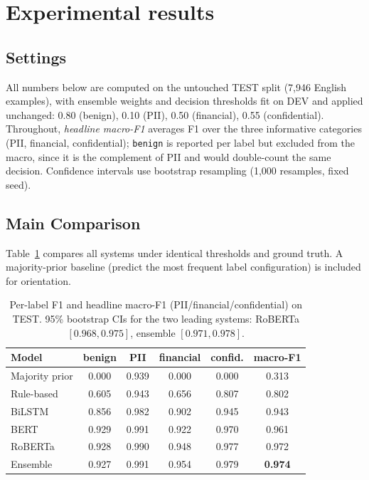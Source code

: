 \documentclass{article}
\begin{document}
\section{Experimental results}
\label{sec:results}

\subsection{Settings}
\label{subsec:settings}

All numbers below are computed on the untouched TEST split (7{,}946
English examples), with ensemble weights and decision thresholds fit on
DEV and applied unchanged: 0.80 (benign), 0.10 (PII), 0.50 (financial),
0.55 (confidential). Throughout, \emph{headline macro-F1} averages F1
over the three informative categories (PII, financial, confidential);
\texttt{benign} is reported per label but excluded from the macro,
since it is the complement of PII and would double-count the same
decision. Confidence intervals use bootstrap resampling (1{,}000
resamples, fixed seed).

\subsection{Main Comparison}
\label{subsec:main-comparison}

Table~\ref{tab:main-comparison} compares all systems under identical
thresholds and ground truth. A majority-prior baseline (predict the most
frequent label configuration) is included for orientation.

\begin{table}[t]
\centering
\small
\begin{tabular}{lccccc}
\hline
Model & benign & PII & financial & confid. & macro-F1 \\
\hline
Majority prior & 0.000 & 0.939 & 0.000 & 0.000 & 0.313 \\
Rule-based     & 0.605 & 0.943 & 0.656 & 0.807 & 0.802 \\
BiLSTM         & 0.856 & 0.982 & 0.902 & 0.945 & 0.943 \\
BERT           & 0.929 & 0.991 & 0.922 & 0.970 & 0.961 \\
RoBERTa        & 0.928 & 0.990 & 0.948 & 0.977 & 0.972 \\
Ensemble       & 0.927 & 0.991 & 0.954 & 0.979 & \textbf{0.974} \\
\hline
\end{tabular}
\caption{Per-label F1 and headline macro-F1 (PII/financial/confidential)
on TEST. 95\% bootstrap CIs for the two leading systems: RoBERTa
$[0.968, 0.975]$, ensemble $[0.971, 0.978]$.}
\label{tab:main-comparison}
\end{table}
\end{document}
